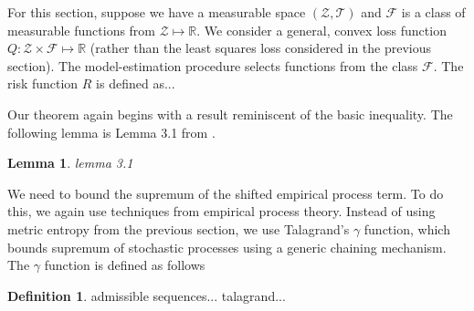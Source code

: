 \documentclass[10pt]{book}
\newtheorem{lemma}{Lemma}
\theoremstyle{definition}
\newtheorem{definition}{Definition}
\begin{document}
For this section, suppose we have a measurable space $(\mathcal{Z}, \mathcal{T})$ and $\mathcal{F}$ is a class of measurable functions from $\mathcal{Z} \mapsto \mathbb{R}$.
We consider a general, convex loss function $Q: \mathcal{Z} \times \mathcal{F} \mapsto \mathbb{R}$ (rather than the least squares loss considered in the previous section).
The model-estimation procedure selects functions from the class $\mathcal{F}$.
The risk function $R$ is defined as...

Our theorem again begins with a result reminiscent of the basic inequality.
The following lemma is Lemma 3.1 from \citet{lecue2012oracle}.
\begin{lemma}
	lemma 3.1
\end{lemma}

We need to bound the supremum of the shifted empirical process term.
To do this, we again use techniques from empirical process theory.
Instead of using metric entropy from the previous section, we use Talagrand's $\gamma$ function, which bounds supremum of stochastic processes using a generic chaining mechanism.
The $\gamma$ function is defined as follows
\begin{definition}
	admissible sequences...
	talagrand...
\end{definition}
\end{document}
